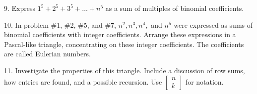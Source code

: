 \documentclass[10pt,]{book}
\theoremstyle{plain}
\theoremstyle{definition}
\theoremstyle{definition}
\theoremstyle{definition}
\numberwithin{equation}{chapter}
\begin{document}
\begin{exerciselist}
\item[9.]\hypertarget{exercise-43}{}\hypertarget{p-1718}{}%
Express \(1^{5} + 2^{5} + 3^{5} + \ldots + n^{5}\) as a sum of multiples of binomial coefficients.%
\par\smallskip
\item[10.]\hypertarget{exercise-44}{}\hypertarget{p-1719}{}%
In problem \#1, \#2, \#5, and \#7, \(n^{2},n^{3},n^{4},\) and \(n^{5}\) were expressed as sums of binomial coefficients with integer coefficients. Arrange these expressions in a Pascal-like triangle, concentrating on these integer coefficients. The coefficients are called Eulerian numbers.%
\par\smallskip
\item[11.]\hypertarget{exercise-45}{}\hypertarget{p-1720}{}%
Investigate the properties of this triangle. Include a discussion of row sums, how entries are found, and a possible recursion. Use \(\begin{bmatrix}
n\\
k
\end{bmatrix}\) for notation.%
\par\smallskip
\end{exerciselist}
\typeout{************************************************}
\typeout{************************************************}
\end{document}
